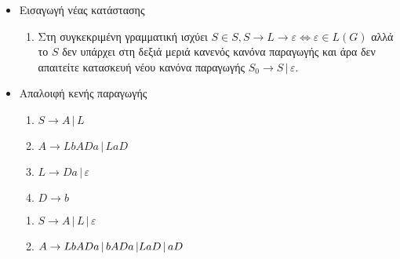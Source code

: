
\begin{tcolorbox}[colback=yellow!15!white, colframe=blue!50!white,
	fonttitle=\bfseries\Large, title = Μετατροπή $CFG\rightarrow CNF$ 1/3]

\begin{itemize}
	\itemsep0em

	\item Εισαγωγή νέας κατάστασης
	\reducevspace\reducevspace\reducevspace\reducevspace\reducevspace\reducevspace\reducevspace
		\begin{enumerate}

			\item Στη συγκεκριμένη γραμματική ισχύει $S \in S, S\rightarrow L\rightarrow \varepsilon
			\Leftrightarrow \varepsilon \in L(G)$ αλλά το $S$ δεν υπάρχει στη δεξιά μεριά κανενός κανόνα παραγωγής
			και άρα δεν απαιτείτε κατασκευή νέου κανόνα παραγωγής $S_0\rightarrow S\,|\,\varepsilon$.

		\end{enumerate}

	\item Απαλοιφή κενής παραγωγής
	\reducevspace\reducevspace\reducevspace\reducevspace\reducevspace\reducevspace\reducevspace

		\begin{minipage}[t]{0.5\textwidth}
			\begin{enumerate}

				\item $S\rightarrow A \,|\, L$

				\item $A\rightarrow LbADa \,|\, LaD$

				\item $L\rightarrow Da \,|\, \varepsilon$

				\item $D\rightarrow b$

			\end{enumerate}
		\end{minipage}%
		\hfill
		\begin{minipage}[t]{0.5\textwidth}
			\begin{enumerate}

				\item $S\rightarrow Α \,|\, L \,|\, \varepsilon$

				\item $A\rightarrow LbADa \,|\, bADa \,|\\
									LaD \,|\, aD$


\end{enumerate}
\end{minipage}
\end{itemize}
\end{tcolorbox}
